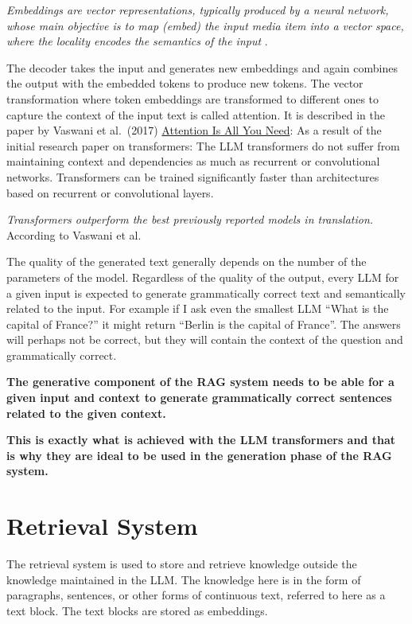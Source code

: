 \documentclass{wseas}
\begin{document}
\emph{Embeddings are vector representations, typically produced by a
neural network, whose main objective is to map (embed) the input media
item into a vector space, where the locality encodes the semantics of
the input} \cite{cite2}.

The decoder takes the input and generates new embeddings and again
combines the output with the embedded tokens to produce new tokens. The
vector transformation where token embeddings are transformed to
different ones to capture the context of the input text is called
attention. It is described in the paper by Vaswani et al.~(2017)
\href{https://arxiv.org/pdf/1706.03762}{Attention Is All You Need}: As a
result of the initial research paper on transformers: The LLM
transformers do not suffer from maintaining context and dependencies as
much as recurrent or convolutional networks.
Transformers can be trained significantly faster than architectures
based on recurrent or convolutional layers.

\emph{Transformers outperform the best previously reported models in
translation.} According to Vaswani et al.~\cite{cite1}

The quality of the generated text generally depends on the number of the
parameters of the model. Regardless of the quality of the output, every
LLM for a given input is expected to generate grammatically correct text
and semantically related to the input. For example if I ask even the
smallest LLM ``What is the capital of France?'' it might return ``Berlin
is the capital of France''. The answers will perhaps not be correct, but
they will contain the context of the question and grammatically correct.

\textbf{The generative component of the RAG system needs to be able for
a given input and context to generate grammatically correct sentences
related to the given context.}

\textbf{This is exactly what is achieved with the LLM transformers and
that is why they are ideal to be used in the generation phase of the RAG
system.}

\section{Retrieval System}

The retrieval system is used to store and retrieve knowledge outside the
knowledge maintained in the LLM. The knowledge here is in the form of
paragraphs, sentences, or other forms of continuous text, referred to
here as a text block. The text blocks are stored as embeddings.
\end{document}
